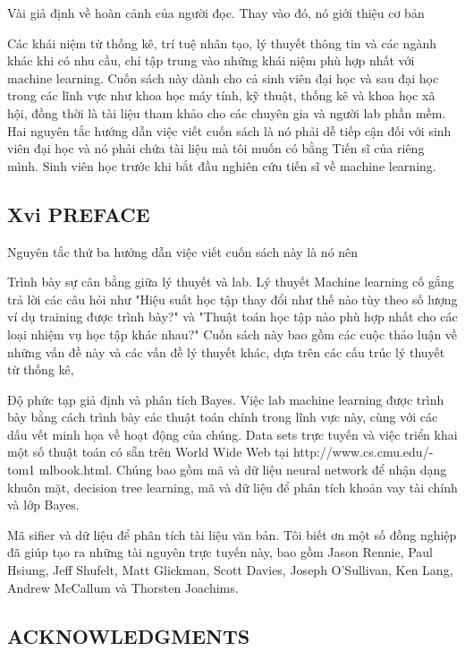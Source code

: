 Vài giả định về hoàn cảnh của người đọc. Thay vào đó, nó giới thiệu cơ bản

Các khái niệm từ thống kê, trí tuệ nhân tạo, lý thuyết thông tin và các ngành khác khi có nhu cầu, chỉ tập trung vào những khái niệm phù hợp nhất với machine learning. Cuốn sách này dành cho cả sinh viên đại học và sau đại học trong các lĩnh vực như khoa học máy tính, kỹ thuật, thống kê và khoa học xã hội, đồng thời là tài liệu tham khảo cho các chuyên gia và người lab phần mềm. Hai nguyên tắc hướng dẫn việc viết cuốn sách là nó phải dễ tiếp cận đối với sinh viên đại học và nó phải chứa tài liệu mà tôi muốn có bằng Tiến sĩ của riêng mình. Sinh viên học trước khi bắt đầu nghiên cứu tiến sĩ về machine learning.

\subsection{Xvi PREFACE}

Nguyên tắc thứ ba hướng dẫn việc viết cuốn sách này là nó nên

Trình bày sự cân bằng giữa lý thuyết và lab. Lý thuyết Machine learning cố gắng trả lời các câu hỏi như "Hiệu suất học tập thay đổi như thế nào tùy theo số lượng ví dụ training được trình bày?" và "Thuật toán học tập nào phù hợp nhất cho các loại nhiệm vụ học tập khác nhau?" Cuốn sách này bao gồm các cuộc thảo luận về những vấn đề này và các vấn đề lý thuyết khác, dựa trên các cấu trúc lý thuyết từ thống kê,

Độ phức tạp giả định và phân tích Bayes. Việc lab machine learning được trình bày bằng cách trình bày các thuật toán chính trong lĩnh vực này, cùng với các dấu vết minh họa về hoạt động của chúng. Data sets trực tuyến và việc triển khai một số thuật toán có sẵn trên World Wide Web tại http://www.cs.cmu.edu/-tom1 mlbook.html. Chúng bao gồm mã và dữ liệu neural network để nhận dạng khuôn mặt, decision tree learning, mã và dữ liệu để phân tích khoản vay tài chính và lớp Bayes.

Mã sifier và dữ liệu để phân tích tài liệu văn bản. Tôi biết ơn một số đồng nghiệp đã giúp tạo ra những tài nguyên trực tuyến này, bao gồm Jason Rennie, Paul Hsiung, Jeff Shufelt, Matt Glickman, Scott Davies, Joseph O'Sullivan, Ken Lang, Andrew McCallum và Thorsten Joachims.

\subsection{ACKNOWLEDGMENTS}

